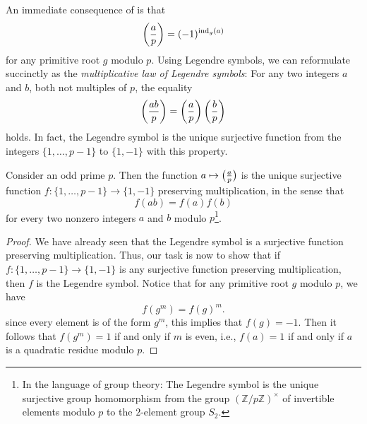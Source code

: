 An immediate consequence of  is that
\begin{equation*}
  \legendre{a}{p}=(-1)^{\ind_g(a)}
\end{equation*}
for any primitive root $g$ modulo $p$. Using Legendre symbols, we can reformulate  succinctly as the \emph{multiplicative law of Legendre symbols}: For any two integers $a$ and $b$, both not multiples of $p$, the equality
\begin{equation*}
  \legendre{ab}{p}=\legendre{a}{p}\legendre{b}{p}
\end{equation*}
holds. In fact, the Legendre symbol is the unique surjective function from the integers $\{1,\ldots,p-1\}$ to $\{1,-1\}$ with this property.

\begin{theorem}
  Consider an odd prime $p$. Then the function $a\mapsto \legendre{a}{p}$ is the unique surjective function $f:\{1,\ldots,p-1\}\to\{1,-1\}$ preserving multiplication, in the sense that
  \begin{equation*}
    f(ab)=f(a)f(b)
  \end{equation*}
  for every two nonzero integers $a$ and $b$ modulo $p$\footnote{In the language of group theory: The Legendre symbol is the unique surjective group homomorphism from the group $(\mathbb{Z}/p\mathbb{Z})^{\times}$ of invertible elements modulo $p$ to the $2$-element group $S_2$.}.
\end{theorem}

\begin{proof}
  We have already seen that the Legendre symbol is a surjective function preserving multiplication. Thus, our task is now to show that if $f:\{1,\ldots,p-1\}\to\{1,-1\}$ is any surjective function preserving multiplication, then $f$ is the Legendre symbol. Notice that for any primitive root $g$ modulo $p$, we have
  \begin{equation*}
    f(g^m)=f(g)^m.
  \end{equation*}
  since every element is of the form $g^m$, this implies that $f(g)=-1$. Then it follows that $f(g^m)=1$ if and only if $m$ is even, i.e., $f(a)=1$ if and only if $a$ is a quadratic residue modulo $p$.
\end{proof}

